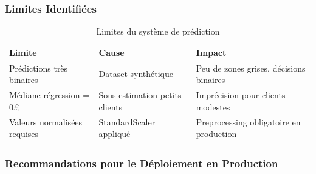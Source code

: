 \documentclass[11pt,a4paper]{article}
\begin{document}
\subsubsection{Limites Identifiées}

\begin{table}[H]
	\centering
	\caption{Limites du système de prédiction}
	\label{tab:limitations}
	\begin{tabular}{|l|l|l|}
		\hline
		\textbf{Limite} & \textbf{Cause} & \textbf{Impact} \\
		\hline
		Prédictions très binaires & Dataset synthétique & Peu de zones grises, décisions binaires \\
		Médiane régression = 0£ & Sous-estimation petits clients & Imprécision pour clients modestes \\
		Valeurs normalisées requises & StandardScaler appliqué & Preprocessing obligatoire en production \\
		\hline
	\end{tabular}
\end{table}
\subsubsection{Recommandations pour le Déploiement en Production}
\end{document}
